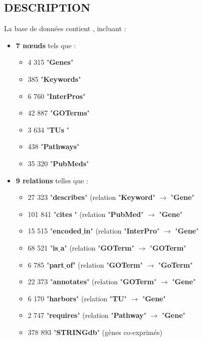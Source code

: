 \documentclass[a4paper,11pt,openright]{report}
\begin{document}
\subsection{DESCRIPTION}
La base de données contient , incluant :
\begin{itemize}
\item \textbf{7 nœuds} tels que :
	\begin{itemize}[label=\textbullet]
	\item 4 315 "\textbf{Genes}"
	\item 385 "\textbf{Keywords}"
	\item 6 760 "\textbf{InterPros}"
	\item 42 887 "\textbf{GOTerms}"
	\item 3 634 "\textbf{TUs} "
	\item 438 "\textbf{Pathways}"
	\item 35 320 "\textbf{PubMeds}"
	\end{itemize}
	
\item \textbf{9 relations } telles que :
	\begin{itemize}[label=\textbullet]
	\item 27 323 "\textbf{describes}" (relation "\textbf{Keyword}" $\rightarrow$ "\textbf{Gene}"
	\item 101 841 "\textbf{cites} " (relation "\textbf{PubMed}" $\rightarrow$ "\textbf{Gene}"
	\item 15 515 "\textbf{encoded$\_$in}" (relation "\textbf{InterPro}" $\rightarrow$ "\textbf{Gene}"
	\item 68 521 "\textbf{is$\_$a}" (relation "\textbf{GOTerm}" $\rightarrow$ "\textbf{GOTerm}"
	\item 6 785 "\textbf{part$\_$of}" (relation "\textbf{GOTerm}" $\rightarrow$ "\textbf{GoTerm}"
	\item 22 373 "\textbf{annotates}" (relation "\textbf{GOTerm}" $\rightarrow$ "\textbf{Gene}"
	\item 6 170 "\textbf{harbors}" (relation "\textbf{TU}" $\rightarrow$ "\textbf{Gene}"
	\item 2 747 "\textbf{requires}" (relation "\textbf{Pathway}" $\rightarrow$ "\textbf{Gene}"
	\item 378 893 "\textbf{STRINGdb}" (gènes co-exprimés)
	\end{itemize}
	
\end{itemize}
\end{document}
